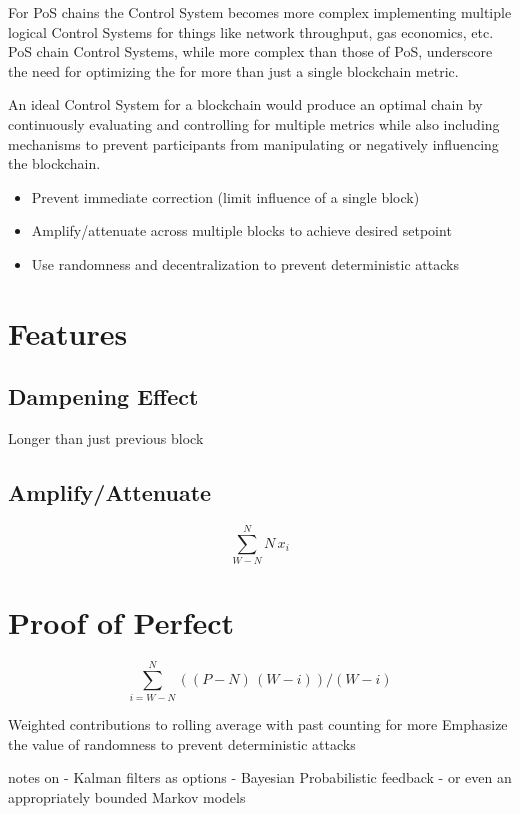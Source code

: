 \documentclass{article}
\begin{document}
For PoS chains the Control System becomes more complex implementing multiple
logical Control Systems for things like network throughput, gas economics, etc.
PoS chain Control Systems, while more complex than those of PoS, underscore the
need for optimizing the for more than just a single blockchain metric.

An ideal Control System for a blockchain would produce an optimal chain by
continuously evaluating and controlling for multiple metrics while also
including mechanisms to prevent participants from manipulating or negatively
influencing the blockchain.

\begin{itemize}
  \item Prevent immediate correction (limit influence of a single block)
  \item Amplify/attenuate across multiple blocks to achieve desired setpoint
  \item Use randomness and decentralization to prevent deterministic attacks
\end{itemize}

\section{Features}
\subsection{Dampening Effect}
Longer than just previous block
\subsection{Amplify/Attenuate}
\[
  \sum_{\mathit{W} - \mathit{N}}^{\mathit{N}} \mathit{N} \, \mathit{x}_{\mathit{i}}
\]

\section{Proof of Perfect}
\[
  \sum_{i = \mathit{W} - \mathit{N}}^{\mathit{N}}
  ((\mathit{P} - \mathit{N}) \, {(\mathit{W} - \mathit{i})}) / (\mathit{W} - \mathit{i})
\]

Weighted contributions to rolling average with past counting for more Emphasize
the value of randomness to prevent deterministic attacks

notes on - Kalman filters as options - Bayesian Probabilistic feedback - or
even an appropriately bounded Markov models
\end{document}
